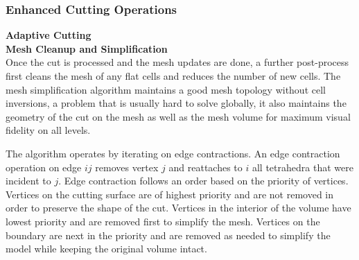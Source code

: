\subsubsection{Enhanced Cutting Operations}

\textbf{Adaptive Cutting}\\

\textbf{Mesh Cleanup and Simplification}\\
Once the cut is processed and the mesh updates are done, a further post-process first cleans the mesh of any flat cells and reduces the number of new cells. The mesh simplification algorithm maintains a good mesh topology without cell inversions, a problem that is usually hard to solve globally, it also maintains the geometry of the cut on the mesh as well as the mesh volume for maximum visual fidelity on all levels.

The algorithm operates by iterating on edge contractions. An edge contraction operation on edge $ij$ removes vertex $j$ and reattaches to $i$ all tetrahedra that were incident to $j$. Edge contraction follows an order based on the priority of vertices. Vertices on the cutting surface are of highest priority and are not removed in order to preserve the shape of the cut. Vertices in the interior of the volume have lowest priority and are removed first to simplify the mesh. Vertices on the boundary are next in the priority and are removed as needed to simplify the model while keeping the original volume intact.
